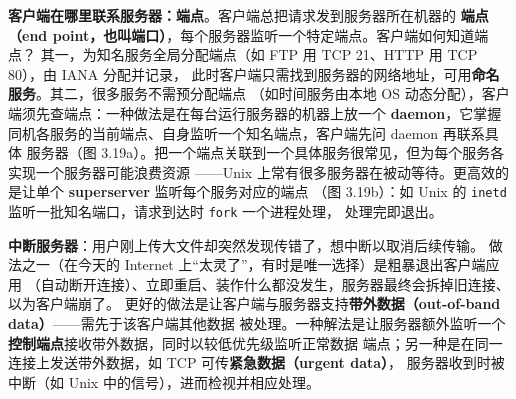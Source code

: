 \medskip\noindent\textbf{客户端在哪里联系服务器：端点}。客户端总把请求发到服务器所在机器的
\textbf{端点（end point，也叫端口）}，每个服务器监听一个特定端点。客户端如何知道端点？
其一，为知名服务全局分配端点（如 FTP 用 TCP 21、HTTP 用 TCP 80），由 IANA 分配并记录，
此时客户端只需找到服务器的网络地址，可用\textbf{命名服务}。其二，很多服务不需预分配端点
（如时间服务由本地 OS 动态分配），客户端须先查端点：一种做法是在每台运行服务器的机器上放一个
\textbf{daemon}，它掌握同机各服务的当前端点、自身监听一个知名端点，客户端先问 daemon 再联系具体
服务器（图 3.19a）。把一个端点关联到一个具体服务很常见，但为每个服务各实现一个服务器可能浪费资源
——Unix 上常有很多服务器在被动等待。更高效的是让单个 \textbf{superserver} 监听每个服务对应的端点
（图 3.19b）：如 Unix 的 \texttt{inetd} 监听一批知名端口，请求到达时 \texttt{fork} 一个进程处理，
处理完即退出。

\medskip\noindent\textbf{中断服务器}：用户刚上传大文件却突然发现传错了，想中断以取消后续传输。
做法之一（在今天的 Internet 上“太灵了”，有时是唯一选择）是粗暴退出客户端应用
（自动断开连接）、立即重启、装作什么都没发生，服务器最终会拆掉旧连接、以为客户端崩了。
更好的做法是让客户端与服务器支持\textbf{带外数据（out-of-band data）}——需先于该客户端其他数据
被处理。一种解法是让服务器额外监听一个\textbf{控制端点}接收带外数据，同时以较低优先级监听正常数据
端点；另一种是在同一连接上发送带外数据，如 TCP 可传\textbf{紧急数据（urgent data）}，
服务器收到时被中断（如 Unix 中的信号），进而检视并相应处理。

